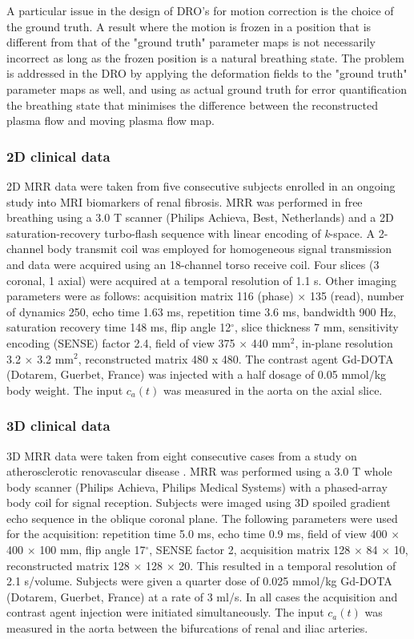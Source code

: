 \documentclass[num-refs]{wiley-article}
\newcommand{\ca}{c_a}
\begin{document}
A particular issue in the design of DRO's for motion correction is the choice of the ground truth. A result where the motion is frozen in a position that is different from that of the "ground truth" parameter maps is not necessarily incorrect as long as the frozen position is a natural breathing state. The problem is addressed in the DRO by applying the deformation fields to the "ground truth" parameter maps as well, and using as actual ground truth for error quantification the breathing state that minimises the difference between the reconstructed plasma flow and moving plasma flow map.

\subsubsection{2D clinical data}

2D MRR data were taken from five consecutive subjects enrolled in an ongoing study into MRI biomarkers of renal fibrosis. MRR was performed in free breathing using a 3.0 T scanner (Philips Achieva, Best, Netherlands) and a 2D saturation-recovery turbo-flash sequence with linear encoding of {\em k}-space. A 2-channel body transmit coil was employed for homogeneous signal transmission and data were acquired using an 18-channel torso receive coil. Four slices (3 coronal, 1 axial) were acquired at a temporal resolution of 1.1 s. Other imaging parameters were as follows: acquisition matrix 116 (phase) $\times$ 135 (read), number of dynamics 250, echo time 1.63 ms, repetition time 3.6 ms, bandwidth 900 Hz, saturation recovery time 148 ms, flip angle 12$^{\circ}$, slice thickness 7 mm, sensitivity encoding (SENSE) factor 2.4, field of view 375 $\times$ 440 mm$^2$, in-plane resolution 3.2 $\times$ 3.2 mm$^{2}$, reconstructed matrix 480 x 480. The contrast agent Gd-DOTA (Dotarem, Guerbet, France) was injected with a half dosage of 0.05 mmol/kg body weight. The input $\ca(t)$ was measured in the aorta on the axial slice. 

\subsubsection{3D clinical data}

3D MRR data were taken from eight consecutive cases from a study on atherosclerotic renovascular disease \cite{Lim2013}. MRR was performed using a 3.0 T whole body scanner (Philips Achieva, Philips Medical Systems) with a phased-array body coil for signal reception. Subjects were imaged using 3D spoiled gradient echo sequence in the oblique coronal plane. The following parameters were used for the acquisition: repetition time 5.0 ms, echo time 0.9 ms, field of view 400 $\times$ 400 $\times$ 100 mm, flip angle 17$^{\circ}$, SENSE factor 2, acquisition matrix 128 $\times$ 84 $\times$ 10, reconstructed matrix 128 $\times$ 128 $\times$ 20. This resulted in a temporal resolution of 2.1 s/volume. Subjects were given a quarter dose of 0.025 mmol/kg Gd-DOTA (Dotarem, Guerbet, France) at a rate of 3 ml/s. In all cases the acquisition and contrast agent injection were initiated simultaneously. The input $\ca(t)$ was measured in the aorta between the bifurcations of renal and iliac arteries.
\end{document}
